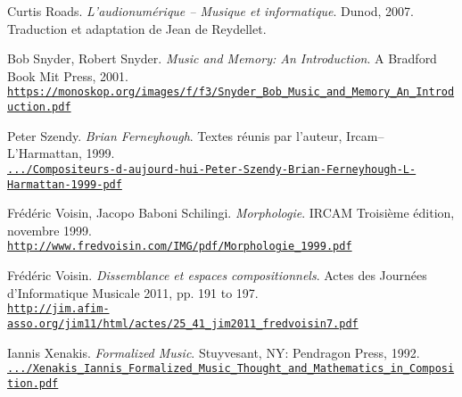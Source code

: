 \begin{thebibliography}{99}
	Curtis Roads. \textit{L'audionumérique -- Musique et informatique}. Dunod, 2007. Traduction et adaptation de Jean de Reydellet.
	
	Bob Snyder, Robert Snyder. \textit{Music and Memory: An Introduction}. A Bradford Book
Mit Press, 2001.\\ 
	\href{https://monoskop.org/images/f/f3/Snyder\_Bob\_Music\_and\_Memory\_An\_Introduction.pdf}{\scriptsize{\texttt{https://monoskop.org/images/f/f3/Snyder\_Bob\_Music\_and\_Memory\_An\_Introduction.pdf}}} \normalsize{}
	
	Peter Szendy. \textit{Brian Ferneyhough}. Textes réunis par l'auteur, Ircam--L'Har\-mattan, 1999.\\ 
	\href{https://www.scribd.com/document/365564172/Compositeurs-d-aujourd-hui-Peter-Szendy-Brian-Ferneyhough-L-Harmattan-1999-pdf}{\scriptsize{\texttt{.../Compositeurs-d-aujourd-hui-Peter-Szendy-Brian-Ferneyhough-L-Harmattan-1999-pdf}}} \normalsize{}
			
	Fr\'{e}d\'{e}ric Voisin, Jacopo Baboni Schilingi. \textit{Morphologie}. IRCAM Troisi\`{e}me \'{e}dition, novembre 1999.\\ 
	\href{http://www.fredvoisin.com/IMG/pdf/Morphologie\_1999.pdf}{\scriptsize{\texttt{http://www.fredvoisin.com/IMG/pdf/Morphologie\_1999.pdf}}} \normalsize{}
	
	Fr\'{e}d\'{e}ric Voisin. \textit{Dissemblance et espaces compositionnels}. Actes des Journées d’Informatique Musicale 2011, pp. 191 to 197.\\ 
	\href{http://jim.afim-asso.org/jim11/html/actes/25\_41\_jim2011\_fredvoisin7.pdf}{\scriptsize{\texttt{http://jim.afim-asso.org/jim11/html/actes/25\_41\_jim2011\_fredvoisin7.pdf}}} \normalsize{}

	Iannis Xenakis. \textit{Formalized Music}. Stuyvesant, NY: Pendragon Press, 1992.\\ 
	\href{https://monoskop.org/images/7/74/Xenakis\_Iannis\_Formalized\_Music\_Thought\_and\_Mathematics\_in\_Composition.pdf}{\scriptsize{\texttt{.../Xenakis\_Iannis\_Formalized\_Music\_Thought\_and\_Mathematics\_in\_Composition.pdf}}} \normalsize{}

\end{thebibliography}